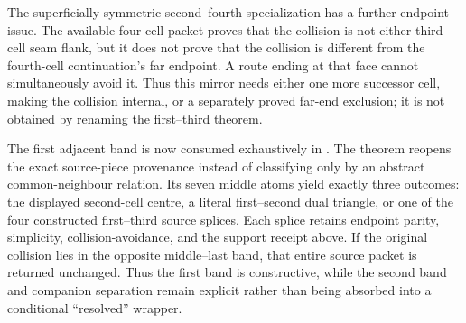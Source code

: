 \documentclass[11pt]{article}
\theoremstyle{definition}
\begin{document}
The superficially symmetric second--fourth specialization has a further
endpoint issue.  The available four-cell packet proves that the collision is
not either third-cell seam flank, but it does not prove that the collision is
different from the fourth-cell continuation's far endpoint.  A route ending
at that face cannot simultaneously avoid it.  Thus this mirror needs either
one more successor cell, making the collision internal, or a separately proved
far-end exclusion; it is not obtained by renaming the first--third theorem.

The first adjacent band is now consumed exhaustively in
.
The theorem reopens the exact source-piece provenance instead of classifying
only by an abstract common-neighbour relation.  Its seven middle atoms yield
exactly three outcomes: the displayed second-cell centre, a literal
first--second dual triangle, or one of the four constructed first--third
source splices.  Each splice retains endpoint parity, simplicity,
collision-avoidance, and the support receipt above.  If the original collision
lies in the opposite middle--last band, that entire source packet is returned
unchanged.  Thus the first band is constructive, while the second band and
companion separation remain explicit rather than being absorbed into a
conditional ``resolved'' wrapper.
\end{document}
